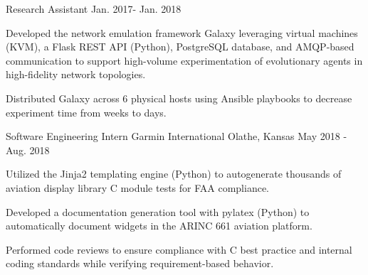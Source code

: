 \begin{cventries}
\cventry
  {Research Assistant} %
  {} %
  {} %
  {Jan. 2017- Jan. 2018} %
  {
    \begin{cvitems} %
      \item {Developed the network emulation framework Galaxy leveraging virtual
        machines (KVM), a Flask REST API (Python), PostgreSQL database, and
        AMQP-based communication to support high-volume experimentation of
        evolutionary agents in high-fidelity network topologies.}
      \item {Distributed Galaxy across 6 physical hosts using Ansible playbooks
        to decrease experiment time from weeks to days.}
    \end{cvitems}
  }


\cventry
  {Software Engineering Intern} %
  {Garmin International} %
  {Olathe, Kansas} %
  {May 2018 - Aug. 2018} %
  {
    \begin{cvitems} %
      \item {Utilized the Jinja2 templating engine (Python) to autogenerate
        thousands of aviation display library C module tests for FAA
        compliance.}
      \item {Developed a documentation generation tool with pylatex (Python) to
        automatically document widgets in the ARINC 661 aviation platform.}
      \item {Performed code reviews to ensure compliance with C best practice
        and internal coding standards while verifying requirement-based behavior.}
    \end{cvitems}
  }



\end{cventries}
